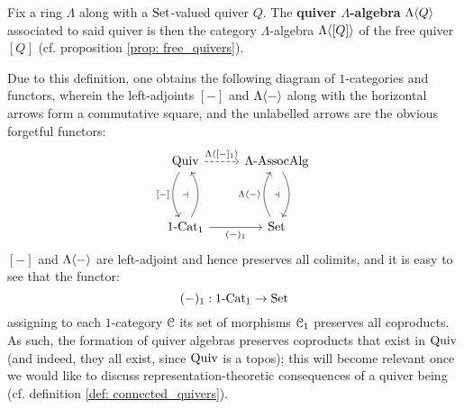             \begin{example} \label{example: category_algebras_of_quivers}
                Fix a ring $\Lambda$ along with a $\mathrm{Set}$-valued quiver $Q$. The \textbf{quiver $\Lambda$-algebra} $\Lambda\langle Q\rangle$ associated to said quiver is then the category $\Lambda$-algebra $\Lambda\langle[Q]\rangle$ of the free quiver $[Q]$ (cf. proposition \ref{prop: free_quivers}). 
                
                Due to this definition, one obtains the following diagram of $1$-categories and functors, wherein the left-adjoints $[-]$ and $\Lambda\langle-\rangle$ along with the horizontal arrows form a commutative square, and the unlabelled arrows are the obvious forgetful functors:
                    $$
                        \begin{tikzcd}
                        	\Quiv & {\Lambda\-\Assoc\Alg} \\
                        	\\
                        	{1\-\Cat_1} & \Sets
                        	\arrow["{(-)_1}"', from=3-1, to=3-2]
                        	\arrow[""{name=0, anchor=center, inner sep=0}, bend right, from=3-1, to=1-1]
                        	\arrow[""{name=1, anchor=center, inner sep=0}, "{[-]}"', bend right, from=1-1, to=3-1]
                        	\arrow[""{name=2, anchor=center, inner sep=0}, "{\Lambda\<-\>}", bend left, from=3-2, to=1-2]
                        	\arrow[""{name=3, anchor=center, inner sep=0}, bend left, from=1-2, to=3-2]
                        	\arrow["{\Lambda\<[-]_1\>}", dashed, from=1-1, to=1-2]
                        	\arrow["\dashv"{anchor=center}, draw=none, from=1, to=0]
                        	\arrow["\dashv"{anchor=center}, draw=none, from=2, to=3]
                        \end{tikzcd}
                    $$
                $[-]$ and $\Lambda\langle-\rangle$ are left-adjoint and hence preserves all colimits, and it is easy to see that the functor:
                    $$(-)_1: 1\text{-}\mathrm{Cat}_1 \to \mathrm{Set}$$
                assigning to each $1$-category $\mathcal{C}$ its set of morphisms $\mathcal{C}_1$ preserves all coproducts. As such, the formation of quiver algebras preserves coproducts that exist in $\mathrm{Quiv}$ (and indeed, they all exist, since $\mathrm{Quiv}$ is a topos); this will become relevant once we would like to discuss representation-theoretic consequences of a quiver being  (cf. definition \ref{def: connected_quivers}).
                

\end{example}
